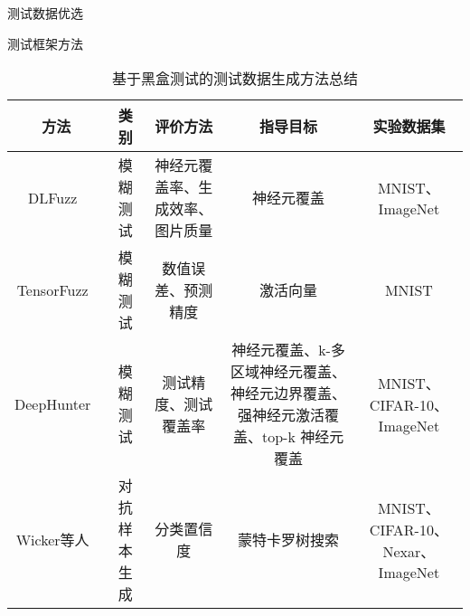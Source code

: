 测试数据优选


测试框架方法




\begin{table}[t]
	\small
	\centering
	\caption{基于黑盒测试的测试数据生成方法总结}
	\label{tab:testingData_blackBox}
	\begin{tabular}{c|c|c|c|c}
		\toprule
		方法 & 类别 & 评价方法 & 指导目标 & 实验数据集 \\
		\midrule
		DLFuzz~\citess{Guo2018DLFuzz} & 模糊测试 & 神经元覆盖率、生成效率、图片质量 & 神经元覆盖 & MNIST、ImageNet \\
		\midrule
	    TensorFuzz~\citess{Odena2019TensorFuzz} & 模糊测试 & 数值误差、预测精度 & 激活向量 & MNIST \\
	    \midrule
	    DeepHunter~\citess{Xie2019Coverage} & 模糊测试 & 测试精度、测试覆盖率 & 神经元覆盖、k-多区域神经元覆盖、神经元边界覆盖、强神经元激活覆盖、top-k 神经元覆盖 & MNIST、CIFAR-10、ImageNet \\
	    \midrule
	    Wicker等人~\citess{Wicker2018FeatureGuided} & 对抗样本生成 & 分类置信度 & 蒙特卡罗树搜索 & MNIST、CIFAR-10、Nexar、ImageNet \\
	    
	    
		\bottomrule
	\end{tabular}
\end{table}


















\begin{spacing}{1.3} %
	 \songti
	
	
	\vspace{11bp}
\end{spacing}
